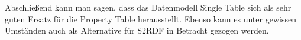 \documentclass[
  a4paper,
  12pt,
  oneside,
  parskip=half,
  headsepline,
]{scrartcl}
\begin{document}
Abschließend kann man sagen, dass das Datenmodell Single Table sich als sehr
guten Ersatz für die Property Table herausstellt. Ebenso kann es unter gewissen
Umständen auch als Alternative für S2RDF in Betracht gezogen werden.




\clearpage
\twocolumn


\appendix

\newpage

\nocite{*}
\end{document}
